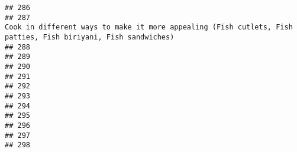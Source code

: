 \documentclass[
]{article}
\begin{document}
\begin{verbatim}
## 286                                                                                                                                                                                                             
## 287                                                                                                Cook in different ways to make it more appealing (Fish cutlets, Fish patties, Fish biriyani, Fish sandwiches)
## 288                                                                                                                                                                                                             
## 289                                                                                                                                                                                                             
## 290                                                                                                                                                                                                             
## 291                                                                                                                                                                                                             
## 292                                                                                                                                                                                                             
## 293                                                                                                                                                                                                             
## 294                                                                                                                                                                                                             
## 295                                                                                                                                                                                                             
## 296                                                                                                                                                                                                             
## 297                                                                                                                                                                                                             
## 298                                                                                                                                                                                                             

\end{verbatim}
\end{document}
